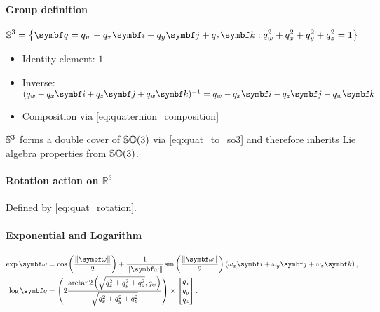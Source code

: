 \begin{properties}[breakable, title={$\Sthree$ as a parameterization of $\SOthree$}]
  \paragraph{Group definition}
  \begin{equation}
    \Sthree = \left\{ \bq = q_w + q_x \bi + q_y \bj + q_z \bk : q_{w}^{2} + q_{x}^{2} + q_y^2 + q_{z}^{2} = 1 \right\}
  \end{equation}
  \begin{itemize}
    \item Identity element: $1$
    \item Inverse: $(q_w + q_x \bi + q_z \bj + q_w \bk)^{-1} = q_w - q_x \bi - q_z \bj - q_w \bk$
    \item Composition via \eqref{eq:quaternion_composition}
  \end{itemize}
  $\Sthree$ forms a double cover of $\SOthree$ via \eqref{eq:quat_to_so3} and therefore inherits Lie algebra properties from $\SOthree$.

  \paragraph{Rotation action on $\mathbb{R}^3$}
  Defined by \eqref{eq:quat_rotation}.

  \paragraph{Exponential and Logarithm}
  \begin{subequations}
    \begin{align}
      \label{eq:s3_exp}
      \exp \bomega & = \cos \left( \frac{\| \bomega \|}{2} \right) + \frac{1}{\| \bomega \|} \sin \left( \frac{\| \bomega \|}{2} \right) \left( \omega_x \bi + \omega_y \bj + \omega_z \bk \right), \\
      \label{eq:s3_log}
      \log \bq     & = \left( 2 \frac{ \arctantwo \left(\sqrt{q_x^2 + q_y^2 + q_z^2}, q_w \right) }{ \sqrt{q_x^2 + q_y^2 + q_z^2} } \right) \times \begin{bmatrix} q_{x} \\ q_{y} \\ q_{z} \end{bmatrix}.
    \end{align}
  \end{subequations}
\end{properties}

